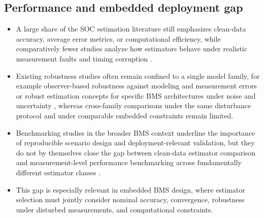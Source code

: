 \documentclass[review]{elsarticle}
\begin{document}
\subsection{Performance and embedded deployment gap}
\begin{itemize}[leftmargin=*]
    \item A large share of the SOC estimation literature still emphasizes clean-data accuracy, average error metrics, or computational efficiency, while comparatively fewer studies analyze how estimators behave under realistic measurement faults and timing corruption \cite{shrivastavaReviewTechnologicalAdvancement2023,Embedded_AI_only_SOC_mobile,giazitzisCaseStudyTiny2024,mazziStateChargeEstimation2022}.
    \item Existing robustness studies often remain confined to a single model family, for example observer-based robustness against modeling and measurement errors \cite{liRobustnessSOCEstimation2015} or robust estimation concepts for specific BMS architectures under noise and uncertainty \cite{naseriReliableWirelessBMS2025}, whereas cross-family comparisons under the same disturbance protocol and under comparable embedded constraints remain limited.
    \item Benchmarking studies in the broader BMS context underline the importance of reproducible scenario design and deployment-relevant validation, but they do not by themselves close the gap between clean-data estimator comparison and measurement-level performance benchmarking across fundamentally different estimator classes \cite{bergerBenchmarkingBatteryManagement2024}.
    \item This gap is especially relevant in embedded BMS design, where estimator selection must jointly consider nominal accuracy, convergence, robustness under disturbed measurements, and computational constraints.
\end{itemize}
\end{document}
